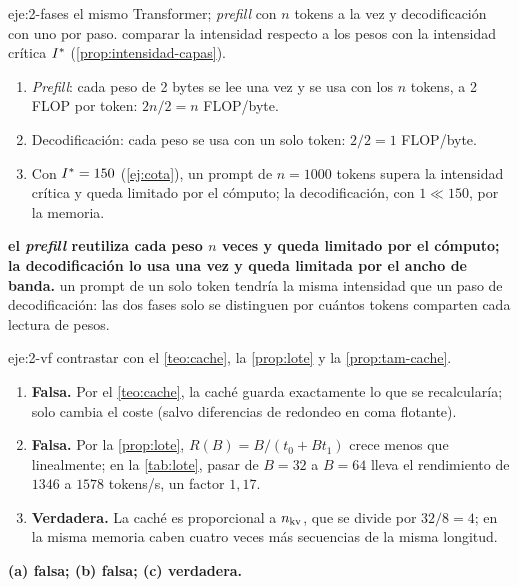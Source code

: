 \begin{solucion}{eje:2-fases}
\datos el mismo Transformer; \emph{prefill} con $n$ tokens a la vez y decodificación con uno por paso.
\planteamiento comparar la intensidad respecto a los pesos con la intensidad crítica $I^{\ast}$ (\cref{prop:intensidad-capas}).
\pasos
\begin{enumerate}[label=\arabic*.]
  \item \emph{Prefill}: cada peso de 2 bytes se lee una vez y se usa con los $n$ tokens, a 2 FLOP por token: $2n/2=n$ FLOP/byte.
  \item Decodificación: cada peso se usa con un solo token: $2/2=1$ FLOP/byte.
  \item Con $I^{\ast}=150$ (\cref{ej:cota}), un prompt de $n=1000$ tokens supera la intensidad crítica y queda limitado por el cómputo; la decodificación, con $1\ll 150$, por la memoria.
\end{enumerate}
\resultado \textbf{el \emph{prefill} reutiliza cada peso $n$ veces y queda limitado por el cómputo; la decodificación lo usa una vez y queda limitada por el ancho de banda.}
\comprobacion un prompt de un solo token tendría la misma intensidad que un paso de decodificación: las dos fases solo se distinguen por cuántos tokens comparten cada lectura de pesos.
\end{solucion}

\begin{solucion}{eje:2-vf}
\planteamiento contrastar con el \cref{teo:cache}, la \cref{prop:lote} y la \cref{prop:tam-cache}.
\pasos
\begin{enumerate}[label=(\alph*)]
  \item \textbf{Falsa.} Por el \cref{teo:cache}, la caché guarda exactamente lo que se recalcularía; solo cambia el coste (salvo diferencias de redondeo en coma flotante).
  \item \textbf{Falsa.} Por la \cref{prop:lote}, $R(B)=B/(t_0+Bt_1)$ crece menos que linealmente; en la \cref{tab:lote}, pasar de $B=32$ a $B=64$ lleva el rendimiento de $1346$ a $1578$ tokens/s, un factor $1{,}17$.
  \item \textbf{Verdadera.} La caché es proporcional a $n_{\mathrm{kv}}$, que se divide por $32/8=4$; en la misma memoria caben cuatro veces más secuencias de la misma longitud.
\end{enumerate}
\resultado \textbf{(a) falsa; (b) falsa; (c) verdadera.}
\end{solucion}


